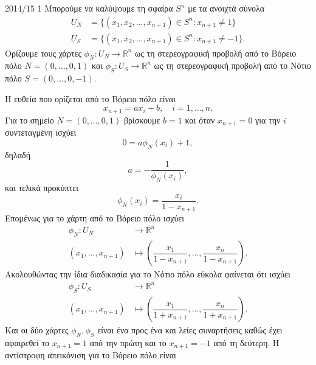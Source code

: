 \documentclass[a4paper,11pt]{article}
\begin{document}
\begin{solution}{2014/15 1}
    Μπορούμε να καλύψουμε τη σφαίρα \( S^n \) με τα ανοιχτά σύνολα
    \begin{align*}
        U_N &= \{ (x_1, x_2, \dots, x_{n+1}) \in S^{n}: x_{n+1} \neq 1 \} \\
        U_S &= \{ (x_1, x_2, \dots, x_{n+1}) \in S^{n}: x_{n+1} \neq -1 \}.
    \end{align*}
    Ορίζουμε τους χάρτες \( \phi_N: U_N \to \mathbb{R}^n \) ως τη στερεογραφική
    προβολή από το Βόρειο πόλο \( N = (0,\dots,0, 1) \) και
    \( \phi_S: U_S \to \mathbb{R}^n \) ως τη στερεογραφική προβολή από το Νότιο
    πόλο \( S = (0,\dots,0, -1) \).

    Η ευθεία που ορίζεται από το Βόρειο πόλο είναι
    \begin{equation*}
        x_{n+1} = a x_i + b, \quad i = 1, \dots, n.
    \end{equation*}
    Για το σημείο \( N = (0,\dots,0,1) \) βρίσκουμε \( b = 1 \) και όταν \(
    x_{n+1} = 0 \) για την \( i \) συντεταγμένη ισχύει
    \begin{equation*}
        0 = a \phi_N(x_i) + 1,
    \end{equation*}
    δηλαδή
    \begin{equation*}
        a = -\dfrac{1}{\phi_N(x_i)},
    \end{equation*}
    και τελικά προκύπτει
    \begin{equation*}
        \phi_N(x_i) = \dfrac{x_i}{1 - x_{n+1}}.
    \end{equation*}
    Επομένως για το χάρτη από το Βόρειο πόλο ισχύει
    \begin{align*}
        \phi_N: U_N &\to \mathbb{R}^n \\
        (x_1, \dots, x_{n+1}) &\mapsto
        \left( \dfrac{x_1}{1 - x_{n+1}}, \dots, \dfrac{x_n}{1 - x_{n+1}}
        \right).
    \end{align*}
    Ακολουθώντας την ίδια διαδικασία για το Νότιο πόλο εύκολα φαίνεται ότι
    ισχύει
    \begin{align*}
        \phi_S: U_S &\to \mathbb{R}^n \\
        (x_1, \dots, x_{n+1}) &\mapsto
        \left( \dfrac{x_1}{1 + x_{n+1}}, \dots, \dfrac{x_n}{1 + x_{n+1}}
        \right).
    \end{align*}
    Και οι δύο χάρτες \( \phi_N, \phi_S \) είναι ένα προς ένα και λείες συναρτήσεις καθώς
    έχει αφαιρεθεί το \( x_{n+1} = 1 \) από την πρώτη και το \( x_{n+1} = -1\)
    από τη δεύτερη. Η αντίστροφη απεικόνιση για το Βόρειο πόλο είναι

\end{solution}
\end{document}
